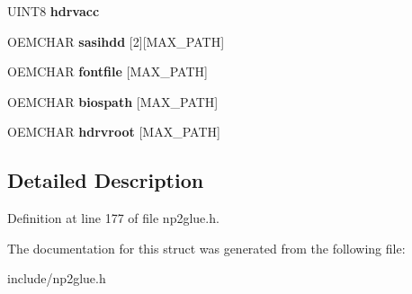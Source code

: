 \begin{DoxyCompactItemize}
\item 
\hypertarget{structNP2CFG_a3fcb7abdb9a79824af6d08d619939bfd}{U\-I\-N\-T8 {\bfseries hdrvacc}}\label{structNP2CFG_a3fcb7abdb9a79824af6d08d619939bfd}

\item 
\hypertarget{structNP2CFG_a10760e7864ee87a272f11d69b443bd9a}{O\-E\-M\-C\-H\-A\-R {\bfseries sasihdd} \mbox{[}2\mbox{]}\mbox{[}M\-A\-X\-\_\-\-P\-A\-T\-H\mbox{]}}\label{structNP2CFG_a10760e7864ee87a272f11d69b443bd9a}

\item 
\hypertarget{structNP2CFG_aad32a36f7c3efd58e91ac63364217251}{O\-E\-M\-C\-H\-A\-R {\bfseries fontfile} \mbox{[}M\-A\-X\-\_\-\-P\-A\-T\-H\mbox{]}}\label{structNP2CFG_aad32a36f7c3efd58e91ac63364217251}

\item 
\hypertarget{structNP2CFG_aa7824b99760945ec89ab24bd58a02f54}{O\-E\-M\-C\-H\-A\-R {\bfseries biospath} \mbox{[}M\-A\-X\-\_\-\-P\-A\-T\-H\mbox{]}}\label{structNP2CFG_aa7824b99760945ec89ab24bd58a02f54}

\item 
\hypertarget{structNP2CFG_a384ccba7ed9a3a5ac5834f2188762322}{O\-E\-M\-C\-H\-A\-R {\bfseries hdrvroot} \mbox{[}M\-A\-X\-\_\-\-P\-A\-T\-H\mbox{]}}\label{structNP2CFG_a384ccba7ed9a3a5ac5834f2188762322}

\end{DoxyCompactItemize}


\subsection{Detailed Description}


Definition at line 177 of file np2glue.\-h.



The documentation for this struct was generated from the following file\-:\begin{DoxyCompactItemize}
\item 
include/np2glue.\-h\end{DoxyCompactItemize}
